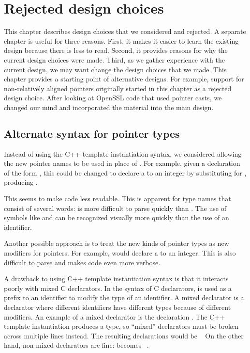 
\chapter{Rejected design choices}
\label{chapter:design-alternatives}

This chapter describes design choices that we considered and rejected.
A separate chapter is useful for three reasons.   First, it makes it 
easier to learn the existing design because there is less to read.
Second, it provides reasons for why the current
design choices were made.  Third, as we gather experience with the current
design, we may want change the design choices that we made. 
This chapter provides a starting point 
of alternative designs.  For example, support for non-relatively 
aligned pointers originally started in this chapter as a rejected design choice. 
After looking at OpenSSL code that
used pointer casts, we changed our mind and incorporated
the material into the main design.

\section{Alternate syntax for pointer types}
\label{section:alternate-pointer-type-syntax}

Instead of using the C++ template instantiation syntax, we
considered allowing the new pointer names to be used in place of \code{*}.
For example, given a declaration of the form , this could be changed
to declare a  to an integer by substituting  for \code{*},
producing .
  
This seems to make code less readable.  This is apparent for type names that 
consist of several words:  is more
difficult to parse quickly than  .
The use of symbols like \code{<} and \code{>} can be recognized 
visually more quickly than the use  of an identifier.  

Another possible approach is to treat the new kinds
of pointer types  as new modifiers for pointers.  For example, 
 would declare a  to an integer. This is 
also difficult to parse and makes code even more verbose.

A drawback to using C++ template instantiation syntax is that it interacts
poorly with mixed C declarators. In the syntax of C declarators, \code{*} is used as
a prefix to an identifier to modify the type of an identifier. A mixed
declarator is a declarator where different identifiers have different
types because of different modifiers. An example of a mixed declarator
is the declaration . The C++ template instantiation produces a
type, so ``mixed'' declarators must be broken across multiple
lines instead. The resulting declarations would be 
 \ptrint\  On the other hand, non-mixed
declarators are fine:  becomes
\ptrint\ .


